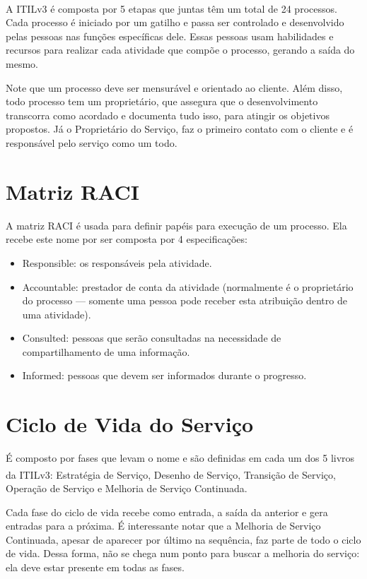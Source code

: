 A ITIL\textsuperscript{\textregistered}v3 é composta por 5 etapas que juntas
têm um total de 24 processos. Cada processo é iniciado por um gatilho e passa
ser controlado e desenvolvido pelas pessoas nas funções específicas dele. Essas
pessoas usam habilidades e recursos para realizar cada atividade que compõe o
processo, gerando a saída do mesmo.

Note que um processo deve ser mensurável e orientado ao cliente. Além disso,
todo processo tem um proprietário, que assegura que o desenvolvimento
transcorra como acordado e documenta tudo isso, para atingir os objetivos
propostos. Já o Proprietário do Serviço, faz o primeiro contato com o cliente e
é responsável pelo serviço como um todo.


\section{Matriz RACI}
\label{sec:funda:raci}

A matriz RACI é usada para definir papéis para execução de um processo. Ela
recebe este nome por ser composta por 4 especificações:
%
\begin{itemize}
    \item Responsible: os responsáveis pela atividade.
    \item Accountable: prestador de conta da atividade (normalmente é o
        proprietário do processo --- somente uma pessoa pode receber esta
        atribuição dentro de uma atividade).
    \item Consulted: pessoas que serão consultadas na necessidade de
        compartilhamento de uma informação.
    \item Informed: pessoas que devem ser informados durante o progresso.
\end{itemize}


\section{Ciclo de Vida do Serviço}
\label{sec:funda:ciclo}

É composto por fases que levam o nome e são definidas em cada um dos 5 livros
da ITIL\textsuperscript{\textregistered}v3: Estratégia de Serviço, Desenho de
Serviço, Transição de Serviço, Operação de Serviço e Melhoria de Serviço
Continuada.

Cada fase do ciclo de vida recebe como entrada, a saída da anterior e gera
entradas para a próxima. É interessante notar que a Melhoria de Serviço
Continuada, apesar de aparecer por último na sequência, faz parte de todo o
ciclo de vida. Dessa forma, não se chega num ponto para buscar a melhoria do
serviço: ela deve estar presente em todas as fases.
